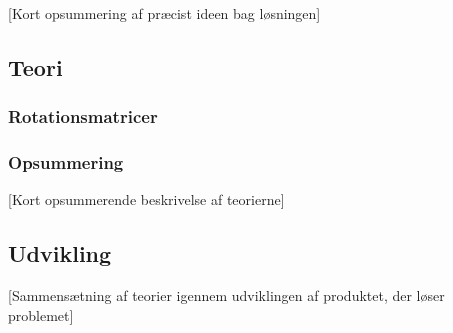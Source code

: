 [Kort opsummering af præcist ideen bag løsningen]

\subsection{Teori}

\subsubsection{Rotationsmatricer}





\subsubsection*{Opsummering}

[Kort opsummerende beskrivelse af teorierne]

\subsection{Udvikling}

[Sammensætning af teorier igennem udviklingen af produktet, der løser problemet]




\clearpage